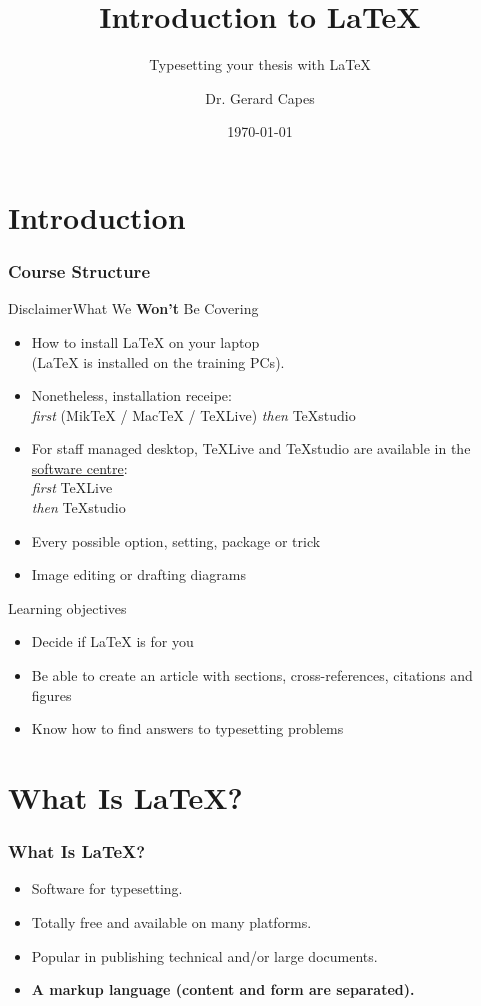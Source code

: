 \documentclass[12pt, aspectratio=169]{beamer}
\title{Introduction to \LaTeX}
\subtitle{Typesetting your thesis with \LaTeX}
\author{Dr. Gerard Capes}
\institute{Research IT\\University of Manchester}
\date{\today{}}
\begin{document}
\begin{frame}
	\titlepage
\end{frame}

\section{Introduction}

\begin{frame}
	\frametitle{Course Structure}
	\tableofcontents
\end{frame}

\begin{frame}{Disclaimer}{What We \textbf{Won't} Be Covering}
	\begin{itemize}
		\item How to install \LaTeX{} on your laptop\\
		(\LaTeX{} is installed on the training PCs).
		\item Nonetheless, installation receipe:\\ \emph{first} (MikTeX / MacTeX / TeXLive) \emph{then} TeXstudio
		\item For staff managed desktop, TeXLive and TeXstudio are available in the \href{http://softwarecentre.itservices.manchester.ac.uk/}{software centre}:\\
		\emph{first} TeXLive\\
		\emph{then} TeXstudio
		\item Every possible option, setting, package or trick
		\item Image editing or drafting diagrams
	\end{itemize}
\end{frame}

\begin{frame}{Learning objectives}
	\begin{itemize}
		\item Decide if \LaTeX{} is for you
		\item Be able to create an article with sections, cross-references, citations and figures
		\item Know how to find answers to typesetting problems
	\end{itemize}
\end{frame}

\section{What Is \LaTeX?}

\begin{frame} \frametitle{What Is \LaTeX?}
	\begin{itemize}
		\item Software for typesetting.
		\item Totally free and available on many platforms.
		\item Popular in publishing technical and/or large documents.
		\item \textbf{A markup language (content and form are separated).}
	\end{itemize}
\end{frame}
\end{document}
